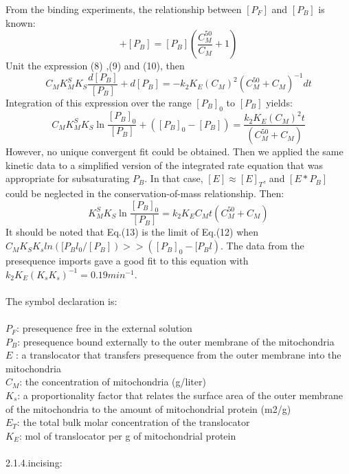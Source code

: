 \documentclass[UTF8]{ctexart}
\begin{document}
From the binding experiments, the relationship between $[P_F]$ and $[P_B]$ is known:
\begin{equation}
[P_F]+[P_B]=[P_B](\frac{C_M^{50}}{C_M}+1)
\end{equation}
Unit the expression (8) ,(9) and (10), then
\begin{equation}
C_MK_M^SK_S \frac{d[P_B]}{[P_B]}+d[P_B]=-k_2K_E(C_M)^2(C_M^{50}+C_M)^{-1} d t
\end{equation}
Integration of this expression over the range $[P_B]_0$ to $[P_B]$ yields:
\begin{equation}
C_MK_M^SK_S\ln\frac{[P_B]_0}{[P_B]}+([P_B]_0-[P_B])=\frac{k_2K_E(C_M)^2 t}{(C_M^{50}+C_M)}
\end{equation}
However, no unique convergent fit could be obtained. Then we applied the same kinetic data to a simplified version of the integrated rate equation that was appropriate for subsaturating $P_B$. In that case,  $[E] \approx [E]_T$, and $[E*P_B]$ could be neglected in the conservation-of-mass relationship. Then:
\begin{equation}
K_M^SK_S\ln\frac{[P_B]_0}{[P_B]}=k_2K_EC_Mt(C_M^{50}+C_M)
\end{equation}
It should be noted that Eq.(13) is the limit of Eq.(12) when $C_MK_S K_sln([P_Bl_0/[P_B]) >> ([P_B]_0 - [P_Bl)$. The data from the presequence imports gave a good fit to this equation with $k_2K_E(K_s K_s)^{-1} = 0.19 min^{-1}$.
	\\\\
	The symbol declaration is:\\\\
	$P_F$: presequence free in the external  solution\\
	$P_B$: presequence bound externally to the outer membrane of the mitochondria\\
	$E$ : a translocator that transfers presequence from the outer membrane into the mitochondria\\
	$C_M$: the concentration of mitochondria (g/liter)\\
	$K_s$: a proportionality factor that relates the surface area of the outer membrane of the mitochondria to the amount of mitochondrial protein (m2/g) \\
	$E_T$: the total bulk molar concentration of the translocator\\
	$K_E$: mol of translocator per g of mitochondrial protein
	\\\\ 
	2.1.4.incising:\\
\end{document}
